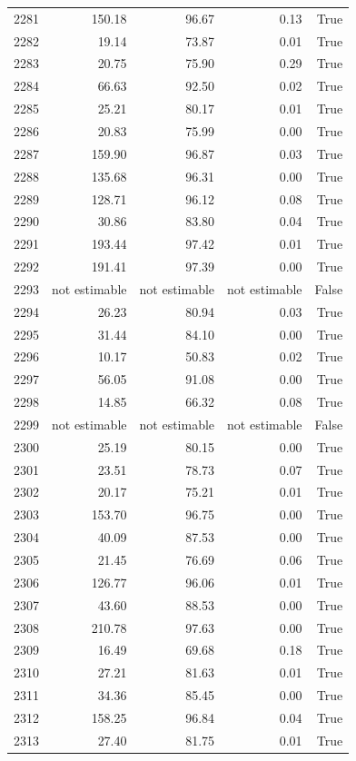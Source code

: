 \begin{longtable}{rrrrr}
2281 & 150.18 & 96.67 & 0.13 & True \\
2282 & 19.14 & 73.87 & 0.01 & True \\
2283 & 20.75 & 75.90 & 0.29 & True \\
2284 & 66.63 & 92.50 & 0.02 & True \\
2285 & 25.21 & 80.17 & 0.01 & True \\
2286 & 20.83 & 75.99 & 0.00 & True \\
2287 & 159.90 & 96.87 & 0.03 & True \\
2288 & 135.68 & 96.31 & 0.00 & True \\
2289 & 128.71 & 96.12 & 0.08 & True \\
2290 & 30.86 & 83.80 & 0.04 & True \\
2291 & 193.44 & 97.42 & 0.01 & True \\
2292 & 191.41 & 97.39 & 0.00 & True \\
2293 & not estimable & not estimable & not estimable & False \\
2294 & 26.23 & 80.94 & 0.03 & True \\
2295 & 31.44 & 84.10 & 0.00 & True \\
2296 & 10.17 & 50.83 & 0.02 & True \\
2297 & 56.05 & 91.08 & 0.00 & True \\
2298 & 14.85 & 66.32 & 0.08 & True \\
2299 & not estimable & not estimable & not estimable & False \\
2300 & 25.19 & 80.15 & 0.00 & True \\
2301 & 23.51 & 78.73 & 0.07 & True \\
2302 & 20.17 & 75.21 & 0.01 & True \\
2303 & 153.70 & 96.75 & 0.00 & True \\
2304 & 40.09 & 87.53 & 0.00 & True \\
2305 & 21.45 & 76.69 & 0.06 & True \\
2306 & 126.77 & 96.06 & 0.01 & True \\
2307 & 43.60 & 88.53 & 0.00 & True \\
2308 & 210.78 & 97.63 & 0.00 & True \\
2309 & 16.49 & 69.68 & 0.18 & True \\
2310 & 27.21 & 81.63 & 0.01 & True \\
2311 & 34.36 & 85.45 & 0.00 & True \\
2312 & 158.25 & 96.84 & 0.04 & True \\
2313 & 27.40 & 81.75 & 0.01 & True \\

\end{longtable}
